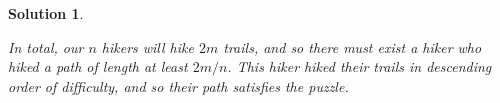 \documentclass{article}\usepackage[a4paper,margin=20mm]{geometry}
\newtheorem{solution}[theorem]{Solution}
\begin{document}
\begin{solution}
\begin{center}
\begin{minipage}{.3\textwidth}
\end{minipage}
\end{center}

In total, our $n$ hikers will hike $2m$ trails, and so there must exist a hiker who hiked a path of length at least $2m/n$.
This hiker hiked their trails in descending order of difficulty, and so their path satisfies the puzzle.
\end{solution}









\end{document}
